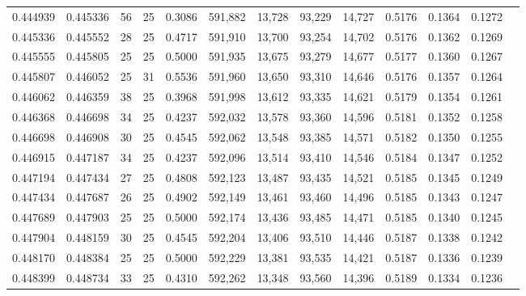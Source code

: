 \begin{tabular}{rrrrrrrrrrrrr}
0.444939 & 0.445336 &    56 &  25 &                                     0.3086 & 591,882 &  13,728 &  93,229 &  14,727 & 0.5176 & 0.1364 & 0.1272 \\
0.445336 & 0.445552 &    28 &  25 &                                     0.4717 & 591,910 &  13,700 &  93,254 &  14,702 & 0.5176 & 0.1362 & 0.1269 \\
0.445555 & 0.445805 &    25 &  25 &                                     0.5000 & 591,935 &  13,675 &  93,279 &  14,677 & 0.5177 & 0.1360 & 0.1267 \\
0.445807 & 0.446052 &    25 &  31 &                                     0.5536 & 591,960 &  13,650 &  93,310 &  14,646 & 0.5176 & 0.1357 & 0.1264 \\
0.446062 & 0.446359 &    38 &  25 &                                     0.3968 & 591,998 &  13,612 &  93,335 &  14,621 & 0.5179 & 0.1354 & 0.1261 \\
0.446368 & 0.446698 &    34 &  25 &                                     0.4237 & 592,032 &  13,578 &  93,360 &  14,596 & 0.5181 & 0.1352 & 0.1258 \\
0.446698 & 0.446908 &    30 &  25 &                                     0.4545 & 592,062 &  13,548 &  93,385 &  14,571 & 0.5182 & 0.1350 & 0.1255 \\
0.446915 & 0.447187 &    34 &  25 &                                     0.4237 & 592,096 &  13,514 &  93,410 &  14,546 & 0.5184 & 0.1347 & 0.1252 \\
0.447194 & 0.447434 &    27 &  25 &                                     0.4808 & 592,123 &  13,487 &  93,435 &  14,521 & 0.5185 & 0.1345 & 0.1249 \\
0.447434 & 0.447687 &    26 &  25 &                                     0.4902 & 592,149 &  13,461 &  93,460 &  14,496 & 0.5185 & 0.1343 & 0.1247 \\
0.447689 & 0.447903 &    25 &  25 &                                     0.5000 & 592,174 &  13,436 &  93,485 &  14,471 & 0.5185 & 0.1340 & 0.1245 \\
0.447904 & 0.448159 &    30 &  25 &                                     0.4545 & 592,204 &  13,406 &  93,510 &  14,446 & 0.5187 & 0.1338 & 0.1242 \\
0.448170 & 0.448384 &    25 &  25 &                                     0.5000 & 592,229 &  13,381 &  93,535 &  14,421 & 0.5187 & 0.1336 & 0.1239 \\
0.448399 & 0.448734 &    33 &  25 &                                     0.4310 & 592,262 &  13,348 &  93,560 &  14,396 & 0.5189 & 0.1334 & 0.1236 \\

\end{tabular}
